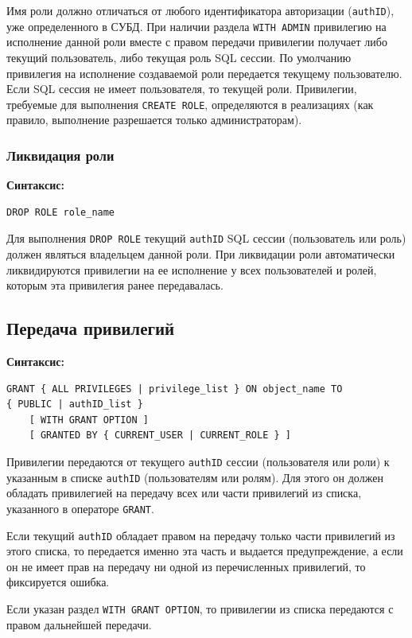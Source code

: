 \documentclass[a4paper,12pt]{article}
\begin{document}
Имя роли должно отличаться от любого идентификатора авторизации (\texttt{authID}), уже определенного в СУБД. При наличии раздела \texttt{WITH ADMIN} привилегию на исполнение данной роли вместе с правом передачи привилегии получает либо текущий пользователь, либо текущая роль SQL сессии. По умолчанию привилегия на исполнение создаваемой роли передается текущему пользователю. Если SQL сессия не имеет пользователя, то текущей роли. Привилегии, требуемые для выполнения \texttt{CREATE ROLE}, определяются в реализациях (как правило, выполнение разрешается только администраторам).

\subsubsection{Ликвидация роли}

\textbf{Синтаксис:}
\begin{verbatim}
DROP ROLE role_name
\end{verbatim}

Для выполнения \texttt{DROP ROLE} текущий \texttt{authID} SQL сессии (пользователь или роль) должен являться владельцем данной роли. При ликвидации роли автоматически ликвидируются привилегии на ее исполнение у всех пользователей и ролей, которым эта привилегия ранее передавалась.

\subsection{Передача привилегий}

\textbf{Синтаксис:}
\begin{verbatim}
GRANT { ALL PRIVILEGES | privilege_list } ON object_name TO 
{ PUBLIC | authID_list }
    [ WITH GRANT OPTION ]
    [ GRANTED BY { CURRENT_USER | CURRENT_ROLE } ]
\end{verbatim}

Привилегии передаются от текущего \texttt{authID} сессии (пользователя или роли) к указанным в списке \texttt{authID} (пользователям или ролям). Для этого он должен обладать привилегией на передачу всех или части привилегий из списка, указанного в операторе \texttt{GRANT}.

Если текущий \texttt{authID} обладает правом на передачу только части привилегий из этого списка, то передается именно эта часть и выдается предупреждение, а если он не имеет прав на передачу ни одной из перечисленных привилегий, то фиксируется ошибка.

Если указан раздел \texttt{WITH GRANT OPTION}, то привилегии из списка передаются с правом дальнейшей передачи.
\end{document}

